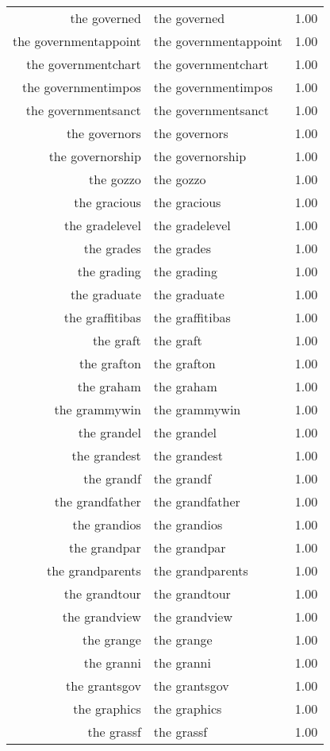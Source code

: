 \begin{table}[ht]
\begin{tabular}{rlr}
  the governed & the governed & 1.00 \\ 
  the governmentappoint & the governmentappoint & 1.00 \\ 
  the governmentchart & the governmentchart & 1.00 \\ 
  the governmentimpos & the governmentimpos & 1.00 \\ 
  the governmentsanct & the governmentsanct & 1.00 \\ 
  the governors & the governors & 1.00 \\ 
  the governorship & the governorship & 1.00 \\ 
  the gozzo & the gozzo & 1.00 \\ 
  the gracious & the gracious & 1.00 \\ 
  the gradelevel & the gradelevel & 1.00 \\ 
  the grades & the grades & 1.00 \\ 
  the grading & the grading & 1.00 \\ 
  the graduate & the graduate & 1.00 \\ 
  the graffitibas & the graffitibas & 1.00 \\ 
  the graft & the graft & 1.00 \\ 
  the grafton & the grafton & 1.00 \\ 
  the graham & the graham & 1.00 \\ 
  the grammywin & the grammywin & 1.00 \\ 
  the grandel & the grandel & 1.00 \\ 
  the grandest & the grandest & 1.00 \\ 
  the grandf & the grandf & 1.00 \\ 
  the grandfather & the grandfather & 1.00 \\ 
  the grandios & the grandios & 1.00 \\ 
  the grandpar & the grandpar & 1.00 \\ 
  the grandparents & the grandparents & 1.00 \\ 
  the grandtour & the grandtour & 1.00 \\ 
  the grandview & the grandview & 1.00 \\ 
  the grange & the grange & 1.00 \\ 
  the granni & the granni & 1.00 \\ 
  the grantsgov & the grantsgov & 1.00 \\ 
  the graphics & the graphics & 1.00 \\ 
  the grassf & the grassf & 1.00 \\ 

\end{tabular}
\end{table}
